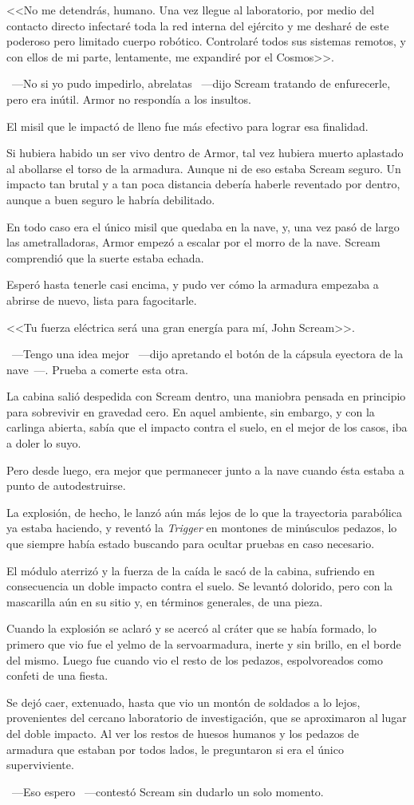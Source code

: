 <<No me detendrás, humano. Una vez llegue al laboratorio, por medio del contacto directo infectaré toda la red interna del ejército y me desharé de este poderoso pero limitado cuerpo robótico. Controlaré todos sus sistemas remotos, y con ellos de mi parte, lentamente, me expandiré por el Cosmos>>.

~---No si yo pudo impedirlo, abrelatas ~---dijo Scream tratando de enfurecerle, pero era inútil. Armor no respondía a los insultos.

El misil que le impactó de lleno fue más efectivo para lograr esa finalidad.

Si hubiera habido un ser vivo dentro de Armor, tal vez hubiera muerto aplastado al abollarse el torso de la armadura. Aunque ni de eso estaba Scream seguro. Un impacto tan brutal y a tan poca distancia debería haberle reventado por dentro, aunque a buen seguro le habría debilitado.

En todo caso era el único misil que quedaba en la nave, y, una vez pasó de largo las ametralladoras, Armor empezó a escalar por el morro de la nave. Scream comprendió que la suerte estaba echada.

Esperó hasta tenerle casi encima, y pudo ver cómo la armadura empezaba a abrirse de nuevo, lista para fagocitarle.

<<Tu fuerza eléctrica será una gran energía para mí, John Scream>>.

~---Tengo una idea mejor ~---dijo apretando el botón de la cápsula eyectora de la nave~---. Prueba a comerte esta otra.

La cabina salió despedida con Scream dentro, una maniobra pensada en principio para sobrevivir en gravedad cero. En aquel ambiente, sin embargo, y con la carlinga abierta, sabía que el impacto contra el suelo, en el mejor de los casos, iba a doler lo suyo.

Pero desde luego, era mejor que permanecer junto a la nave cuando ésta estaba a punto de autodestruirse.

La explosión, de hecho, le lanzó aún más lejos de lo que la trayectoria parabólica ya estaba haciendo, y reventó la \emph{Trigger} en montones de minúsculos pedazos, lo que siempre había estado buscando para ocultar pruebas en caso necesario.

El módulo aterrizó y la fuerza de la caída le sacó de la cabina, sufriendo en consecuencia un doble impacto contra el suelo. Se levantó dolorido, pero con la mascarilla aún en su sitio y, en términos generales, de una pieza.

Cuando la explosión se aclaró y se acercó al cráter que se había formado, lo primero que vio fue el yelmo de la servoarmadura, inerte y sin brillo, en el borde del mismo. Luego fue cuando vio el resto de los pedazos, espolvoreados como confeti de una fiesta.

Se dejó caer, extenuado, hasta que vio un montón de soldados a lo lejos, provenientes del cercano laboratorio de investigación, que se aproximaron al lugar del doble impacto. Al ver los restos de huesos humanos y los pedazos de armadura que estaban por todos lados, le preguntaron si era el único superviviente.

~---Eso espero ~---contestó Scream sin dudarlo un solo momento.

\endinput

